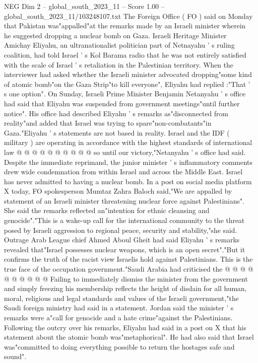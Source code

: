 \begin{textsample}{NEG Dim 2 – global\_south\_2023\_11 – Score 1.00 – global\_south\_2023\_11/103248107.txt}  \label{ex:f2_neg_357}
The Foreign Office ( FO ) said on Monday that Pakistan was"appalled"at the remarks made by an Israeli minister wherein he suggested dropping a nuclear bomb on Gaza.
Israeli Heritage Minister Amichay Eliyahu, an ultranationalist politician part of Netnayahu ' s ruling coalition, had told Israel ' s Kol Barama radio that he was not entirely satisfied with the scale of Israel ' s retaliation in the Palestinian territory.
When the interviewer had asked whether the Israeli minister advocated dropping"some kind of atomic bomb"on the Gaza Strip"to kill everyone", Eliyahu had replied :"That ' s one option".
On Sunday, Israeli Prime Minister Benjamin Netanyahu ' s office had said that Eliyahu was suspended from government meetings"until further notice".
His office had described Eliyahu ' s remarks as"disconnected from reality"and added that Israel was trying to spare"non-combatants"in Gaza."Eliyahu ' s statements are not based in reality.
Israel and the IDF ( military ) are operating in accordance with the highest standards of international law @ @ @ @ @ @ @ @ @ @ so until our victory,"Netanyahu ' s office had said.
Despite the immediate reprimand, the junior minister ' s inflammatory comments drew wide condemnation from within Israel and across the Middle East.
Israel has never admitted to having a nuclear bomb.
In a post on social media platform X today, FO spokesperson Mumtaz Zahra Baloch said,"We are appalled by statement of an Israeli minister threatening nuclear force against Palestinians".
She said the remarks reflected an"intention for ethnic cleansing and genocide"."This is a wake-up call for the international community to the threat posed by Israeli aggression to regional peace, security and stability,"she said.
Outrage Arab League chief Ahmed Aboul Gheit had said Eliyahu ' s remarks revealed that"Israel possesses nuclear weapons, which is an open secret"."But it confirms the truth of the racist view Israelis hold against Palestinians.
This is the true face of the occupation government."Saudi Arabia had criticised the @ @ @ @ @ @ @ @ @ @ Failing to immediately dismiss the minister from the government and simply freezing his membership reflects the height of disdain for all human, moral, religious and legal standards and values of the Israeli government,"the Saudi foreign ministry had said in a statement.
Jordan said the minister ' s remarks were a"call for genocide and a hate crime"against the Palestinians.
Following the outcry over his remarks, Eliyahu had said in a post on X that his statement about the atomic bomb was"metaphorical".
He had also said that Israel was"committed to doing everything possible to return the hostages safe and sound".

\end{textsample}
